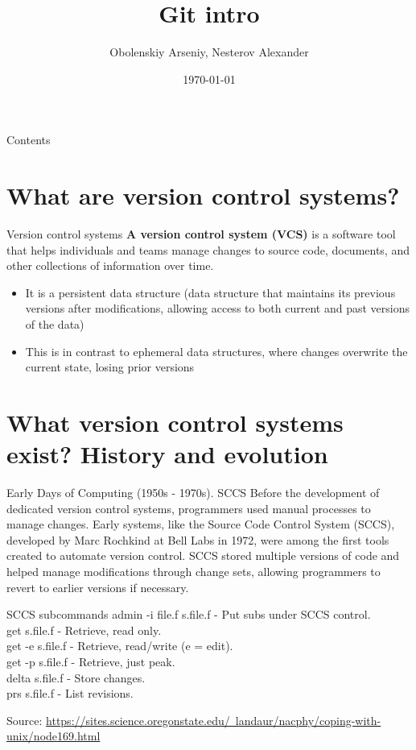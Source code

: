 \documentclass{beamer}
\title[Git intro]{Git intro}
\author{Obolenskiy Arseniy, Nesterov Alexander}
\institute{ITLab}
\date{\today}
\begin{document}
\begin{frame}
    \titlepage
\end{frame}

\begin{frame}{Contents}
    \tableofcontents
\end{frame}

\section{What are version control systems?}

\begin{frame}{Version control systems}
  \textbf{A version control system (VCS)} is a software tool that helps individuals and teams manage changes to source code, documents, and other collections of information over time.
  \begin{itemize}
    \item It is a persistent data structure (data structure that maintains its previous versions after modifications, allowing access to both current and past versions of the data)
    \item This is in contrast to ephemeral data structures, where changes overwrite the current state, losing prior versions
  \end{itemize}
\end{frame}

\section{What version control systems exist? History and evolution}

\begin{frame}{Early Days of Computing (1950s - 1970s). SCCS}
  Before the development of dedicated version control systems, programmers used manual processes to manage changes. Early systems, like the Source Code Control System (SCCS), developed by Marc Rochkind at Bell Labs in 1972, were among the first tools created to automate version control. SCCS stored multiple versions of code and helped manage modifications through change sets, allowing programmers to revert to earlier versions if necessary.
  \begin{block}{SCCS subcommands}
    admin -i file.f s.file.f - Put subs under SCCS control.\\
    get s.file.f - Retrieve, read only.\\
    get -e s.file.f - Retrieve, read/write (e = edit).\\
    get -p s.file.f - Retrieve, just peak.\\
    delta s.file.f - Store changes.\\
    prs s.file.f - List revisions.\\
  \end{block}

  \footnotesize Source: \href{https://sites.science.oregonstate.edu/~landaur/nacphy/coping-with-unix/node169.html}{https://sites.science.oregonstate.edu/~landaur/nacphy/coping-with-unix/node169.html}
\end{frame}
\end{document}
